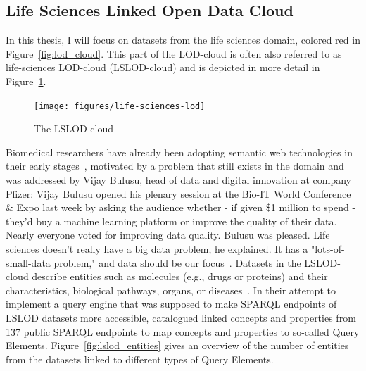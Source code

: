 \documentclass[runningheads]{llncs}
\newenvironment{nbquote} {\quote\interlinepenalty=10000 } {\endquote}
\begin{document}
    \subsection{Life Sciences Linked Open Data Cloud}
    In this thesis, I will focus on datasets from the life sciences domain, colored red in Figure~\ref{fig:lod_cloud}.
    This part of the LOD-cloud is often also referred to as life-sciences LOD-cloud (LSLOD-cloud) and is depicted in more detail in Figure~\ref{fig:lslod_cloud}.

    \begin{figure}[ht]
        \centering
        \texttt{[image: figures/life-sciences-lod]}
        \caption{The LSLOD-cloud\protect\footnotemark[\value{footnote}]}
        \label{fig:lslod_cloud}
    \end{figure}

    Biomedical researchers have already been adopting semantic web technologies in their early stages~\citep{ashburner2000gene, bodenreider2004unified, wang2005xml}, motivated by a problem that still exists in the domain and was addressed by Vijay Bulusu, head of data and digital innovation at company Pfizer:
    \begin{nbquote}
        Vijay Bulusu opened his plenary session at the Bio-IT World Conference \& Expo last week by asking the audience whether - if given \$1 million to spend - they'd buy a machine learning platform or improve the quality of their data.
        Nearly everyone voted for improving data quality.
        Bulusu was pleased.
        Life sciences doesn't really have a big data problem, he explained.
        It has a "lots-of-small-data problem," and data should be our focus~\citep{Pfizer}.
    \end{nbquote}
    Datasets in the LSLOD-cloud describe entities such as molecules (e.g., drugs or proteins) and their characteristics, biological pathways, organs, or diseases~\citep{bodenreider2008biomedical}.
    In their attempt to implement a query engine that was supposed to make SPARQL endpoints of LSLOD datasets more accessible, \citet{kamdar2014roadmap} catalogued linked concepts and properties from 137 public SPARQL endpoints to map concepts and properties to so-called Query Elements.
    Figure~\ref{fig:lslod_entities} gives an overview of the number of entities from the datasets linked to different types of Query Elements.
\end{document}
